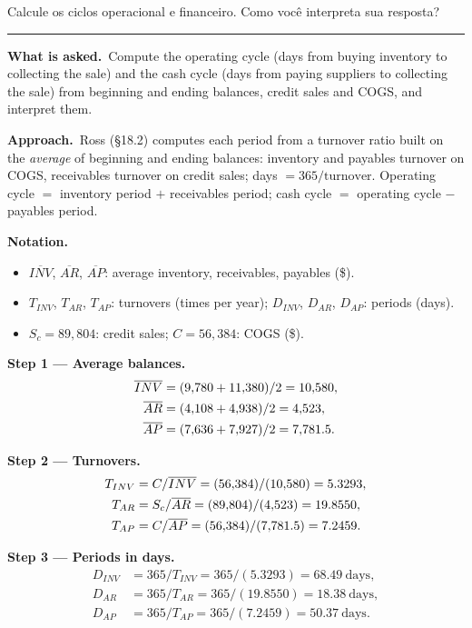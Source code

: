 \documentclass[11pt,a4paper]{article}
\newcommand{\notation}{\par\noindent\textbf{Notation.}}
\newcommand{\step}[2]{\par\medskip\noindent\textbf{Step #1 --- #2.}~}
\newcommand{\asked}{\par\medskip\noindent\textbf{What is asked.}~}
\newcommand{\approach}{\par\smallskip\noindent\textbf{Approach.}~}
\newcommand{\stmtend}{\par\endgroup\nopagebreak\noindent\rule{\linewidth}{0.4pt}\par\medskip}
\begin{document}
Calcule os ciclos operacional e financeiro. Como você interpreta sua resposta?
\stmtend

\asked Compute the operating cycle (days from buying inventory to collecting the sale) and the cash
cycle (days from paying suppliers to collecting the sale) from beginning and ending balances,
credit sales and COGS, and interpret them.

\approach Ross (\S18.2) computes each period from a turnover ratio built on the \emph{average}
of beginning and ending balances: inventory and payables turnover on COGS, receivables turnover
on credit sales; days $=365/\text{turnover}$. Operating cycle $=$ inventory period $+$
receivables period; cash cycle $=$ operating cycle $-$ payables period.

\notation
\begin{itemize}
  \item $\overline{INV}$, $\overline{AR}$, $\overline{AP}$: average inventory, receivables, payables (\$).
  \item $T_{INV}$, $T_{AR}$, $T_{AP}$: turnovers (times per year); $D_{INV}$, $D_{AR}$, $D_{AP}$: periods (days).
  \item $S_c = 89{,}804$: credit sales; $C = 56{,}384$: COGS (\$).
\end{itemize}

\step{1}{Average balances}
\begin{align}
  \overline{INV} &= (9{,}780 + 11{,}380)/2 = 10{,}580, \notag\\
  \overline{AR} &= (4{,}108 + 4{,}938)/2 = 4{,}523, \notag\\
  \overline{AP} &= (7{,}636 + 7{,}927)/2 = 7{,}781.5. \notag
\end{align}

\step{2}{Turnovers}
\begin{align}
  T_{INV} &= C/\overline{INV} = (56{,}384)/(10{,}580) = 5.3293, \notag\\
  T_{AR} &= S_c/\overline{AR} = (89{,}804)/(4{,}523) = 19.8550, \notag\\
  T_{AP} &= C/\overline{AP} = (56{,}384)/(7{,}781.5) = 7.2459. \notag
\end{align}

\step{3}{Periods in days}
\begin{align}
  D_{INV} &= 365/T_{INV} = 365/(5.3293) = 68.49 \ \text{days}, \label{r5be2-inv}\\
  D_{AR} &= 365/T_{AR} = 365/(19.8550) = 18.38 \ \text{days}, \label{r5be2-ar}\\
  D_{AP} &= 365/T_{AP} = 365/(7.2459) = 50.37 \ \text{days}. \label{r5be2-ap}
\end{align}
\end{document}
